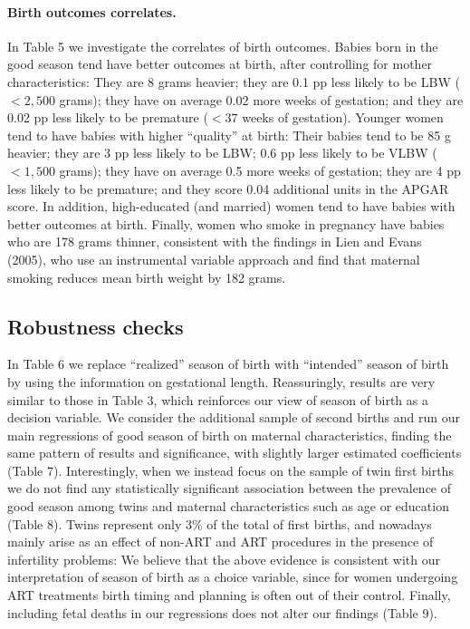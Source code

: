 \documentclass[a4paper, 12 pt]{article}
\theoremstyle{plain}
\begin{document}
\begin{doublespace}
\paragraph{Birth outcomes correlates.} In Table 5 we investigate the correlates of birth outcomes. Babies born in the good season tend have better outcomes at birth, after controlling for mother characteristics: They are 8 grams heavier; they are 0.1 pp less likely to be LBW ($<2,500$ grams); they have on average 0.02 more weeks of gestation; and they are 0.02 pp less likely to be premature ($<37$ weeks of gestation). Younger women tend to have babies with higher ``quality'' at birth: Their babies tend to be 85 g heavier; they are 3 pp less likely to be LBW; 0.6 pp less likely to be VLBW ($<1,500$ grams); they have on average 0.5 more weeks of gestation; they are 4 pp less likely to be premature; and they score 0.04 additional units in the APGAR score. In addition, high-educated (and married) women tend to have babies with better outcomes at birth. Finally, women who smoke in pregnancy have babies who are 178 grams thinner, consistent with the findings in Lien and Evans (2005), who use an instrumental variable approach and find that maternal smoking reduces mean birth weight by 182 grams.



\subsection{Robustness checks}
In Table 6 we replace ``realized'' season of birth with ``intended'' season of birth by using the information on gestational length. Reassuringly, results are very similar to those in Table 3, which reinforces our view of season of birth as a decision variable. We consider the additional sample of second births and run our main regressions of good season of birth on maternal characteristics, finding the same pattern of results and significance, with slightly larger estimated coefficients (Table 7). Interestingly, when we instead focus on the sample of twin first births we do not find any statistically significant association between the prevalence of good season among twins and maternal characteristics such as age or education (Table 8). Twins represent only 3\% of the total of first births, and nowadays mainly arise as an effect of non-ART and ART procedures in the presence of infertility problems: We believe that the above evidence is consistent with our interpretation of season of birth as a choice variable, since for women undergoing ART treatments birth timing and planning is often out of their control. Finally, including fetal deaths in our regressions does not alter our findings (Table 9).


\end{doublespace}
\end{document}
